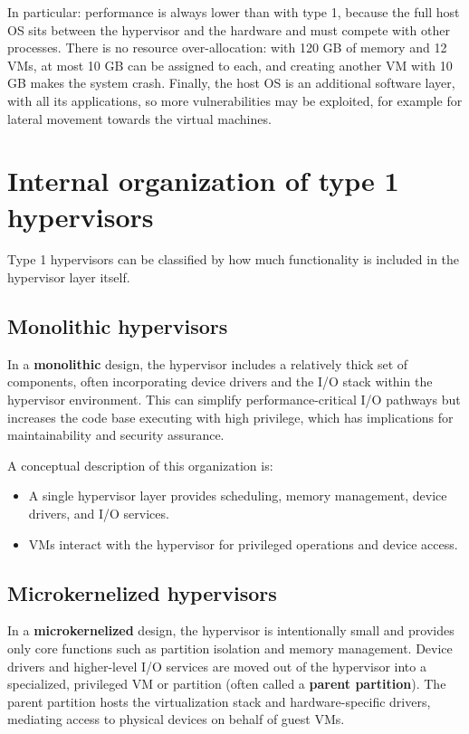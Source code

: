 In particular: performance is always lower than with type 1, because the full host OS sits between the hypervisor and the hardware and must compete with other processes. There is no resource over-allocation: with 120 GB of memory and 12 VMs, at most 10 GB can be assigned to each, and creating another VM with 10 GB makes the system crash. Finally, the host OS is an additional software layer, with all its applications, so more vulnerabilities may be exploited, for example for lateral movement towards the virtual machines.

\section{Internal organization of type 1 hypervisors}

Type 1 hypervisors can be classified by how much functionality is included in the hypervisor layer itself.

\subsection{Monolithic hypervisors}

In a \textbf{monolithic} design, the hypervisor includes a relatively thick set of components, often incorporating device drivers and the I/O stack within the hypervisor environment. This can simplify performance-critical I/O pathways but increases the code base executing with high privilege, which has implications for maintainability and security assurance.

A conceptual description of this organization is:

\begin{itemize}
\item A single hypervisor layer provides scheduling, memory management, device drivers, and I/O services.
\item VMs interact with the hypervisor for privileged operations and device access.
\end{itemize}

\subsection{Microkernelized hypervisors}

In a \textbf{microkernelized} design, the hypervisor is intentionally small and provides only core functions such as partition isolation and memory management. Device drivers and higher-level I/O services are moved out of the hypervisor into a specialized, privileged VM or partition (often called a \textbf{parent partition}). The parent partition hosts the virtualization stack and hardware-specific drivers, mediating access to physical devices on behalf of guest VMs.

